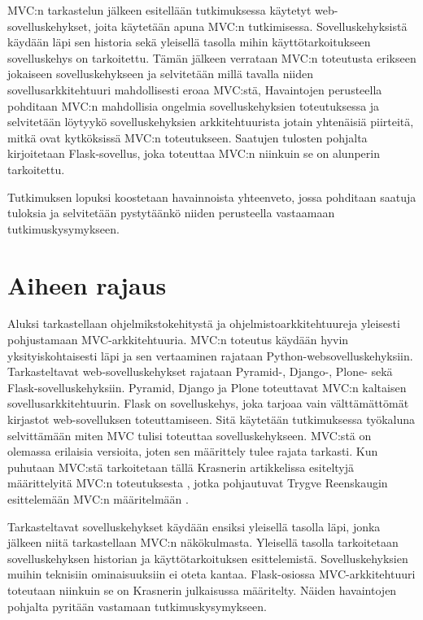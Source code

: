 \documentclass[utf8]{gradu3}
\begin{document}
MVC:n tarkastelun jälkeen esitellään tutkimuksessa käytetyt web-sovelluskehykset, 
joita käytetään apuna MVC:n tutkimisessa. Sovelluskehyksistä käydään läpi sen 
historia sekä yleisellä tasolla mihin käyttötarkoitukseen
sovelluskehys on tarkoitettu. Tämän jälkeen verrataan MVC:n toteutusta erikseen 
jokaiseen sovelluskehykseen ja selvitetään millä tavalla niiden sovellusarkkitehtuuri 
mahdollisesti eroaa MVC:stä,
Havaintojen perusteella pohditaan MVC:n mahdollisia ongelmia sovelluskehyksien toteutuksessa 
ja selvitetään löytyykö sovelluskehyksien arkkitehtuurista jotain yhtenäisiä piirteitä, mitkä ovat
kytköksissä MVC:n toteutukseen. Saatujen tulosten pohjalta  kirjoitetaan Flask-sovellus, joka toteuttaa MVC:n 
niinkuin se on alunperin tarkoitettu.

Tutkimuksen lopuksi koostetaan havainnoista yhteenveto, jossa pohditaan saatuja tuloksia ja selvitetään 
pystytäänkö niiden perusteella vastaamaan tutkimuskysymykseen.


\chapter{Aiheen rajaus}
Aluksi tarkastellaan ohjelmikstokehitystä ja ohjelmistoarkkitehtuureja yleisesti pohjustamaan MVC-arkkitehtuuria. MVC:n toteutus käydään
hyvin yksityiskohtaisesti läpi ja sen vertaaminen rajataan Python-websovelluskehyksiin. Tarkasteltavat web-sovelluskehykset rajataan 
Pyramid-, Django-, Plone- sekä Flask-sovelluskehyksiin. Pyramid, Django ja Plone toteuttavat MVC:n kaltaisen
sovellusarkkitehtuurin. Flask on sovelluskehys, joka tarjoaa vain
välttämättömät kirjastot web-sovelluksen toteuttamiseen. Sitä
käytetään tutkimuksessa työkaluna selvittämään miten MVC tulisi
toteuttaa sovelluskehykseen. MVC:stä on olemassa erilaisia versioita, joten sen määrittely tulee rajata tarkasti.
Kun puhutaan MVC:stä tarkoitetaan tällä Krasnerin
artikkelissa esiteltyjä määrittelyitä MVC:n
toteutuksesta \parencite{krasner}, jotka pohjautuvat Trygve Reenskaugin esittelemään 
MVC:n määritelmään \parencite{xerox-original}. 

Tarkasteltavat sovelluskehykset käydään ensiksi yleisellä tasolla läpi, jonka jälkeen niitä tarkastellaan MVC:n näkökulmasta. Yleisellä tasolla tarkoitetaan sovelluskehyksen historian ja käyttötarkoituksen esittelemistä. Sovelluskehyksien muihin teknisiin ominaisuuksiin ei oteta kantaa. Flask-osiossa MVC-arkkitehtuuri toteutaan niinkuin se on Krasnerin julkaisussa määritelty. Näiden havaintojen pohjalta pyritään vastamaan tutkimuskysymykseen.
\end{document}
